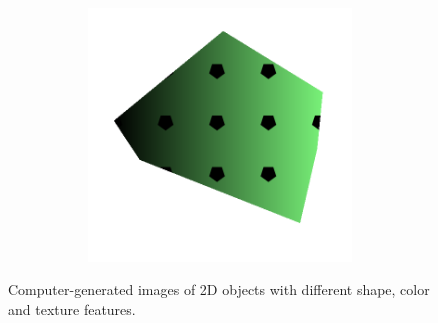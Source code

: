 \begin{figure}[h!]
\begin{center}
\begin{subfigure}[b]{0.15\textwidth}
\begin{center}
\begin{subfigure}[b]{0.9\textwidth}
                \end{subfigure}
                \begin{subfigure}[b]{0.9\textwidth}
                    \includegraphics[width=\linewidth]{figures/generated_objects/img0005.png}
                \end{subfigure}
            \end{center}
        \end{subfigure}
    \end{center}
    \caption{Computer-generated images of 2D objects with different shape, color and texture features.}
    \label{fig:generated_images}
\end{figure}

